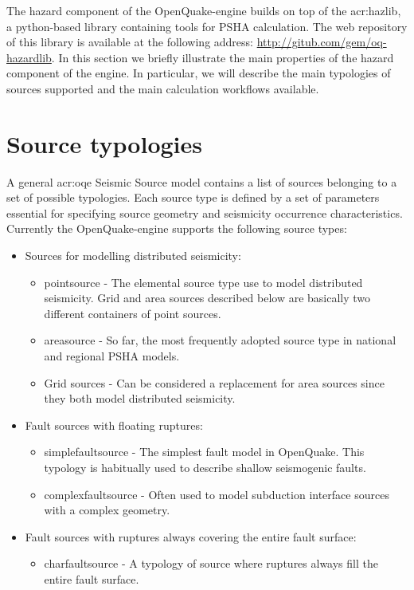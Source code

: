 The hazard component of the OpenQuake-engine builds on top of the 
\gls{acr:hazlib}, a python-based library containing
tools for PSHA calculation. 
%
The web repository of this library is available at the following address: 
\href{http://gitub.com/gem/oq-hazardlib}{http://gitub.com/gem/oq-hazardlib}.
%
In this section we briefly illustrate the main properties of the 
hazard component of the engine. 
%
In particular, we will describe the main typologies of sources supported 
and the main calculation workflows available.
%
\section{Source typologies}
A general \gls{acr:oqe} Seismic Source model contains a list
of sources belonging to a set of possible typologies. 
Each source type is defined by a set of parameters essential for specifying 
source geometry and seismicity occurrence characteristics.
%
Currently the OpenQuake-engine supports the following source types: 
\begin{itemize}
	\item Sources for modelling distributed seismicity:
	\begin{itemize}
		\item \Gls{pointsource} - The elemental source type use to model 
			distributed seismicity. Grid and area sources described below
			are basically two different containers of point sources.
		\item \Gls{areasource} - So far, the most frequently adopted source 
    		type in national and regional PSHA models.
		\item Grid sources - Can be considered a replacement 
    		for area sources since they both model distributed seismicity.
	\end{itemize}
	\item Fault sources with floating ruptures:
	\begin{itemize}
		\item \Gls{simplefaultsource} - The simplest fault model in OpenQuake. 
    		This typology is habitually used to describe shallow seismogenic 
    		faults.
		\item \Gls{complexfaultsource} - Often used to model subduction interface 
			sources with a complex geometry. 
	\end{itemize}
	\item Fault sources with ruptures always covering the entire fault surface:
	\begin{itemize}
		\item \Gls{charfaultsource} - A typology of source where ruptures
		always fill the entire fault surface.
	\end{itemize}
\end{itemize}
